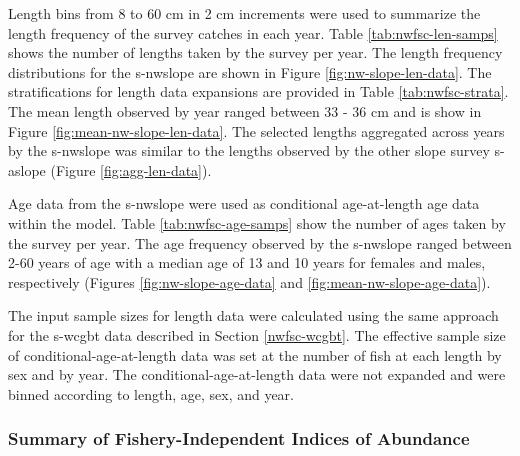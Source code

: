 \documentclass[11pt,
  english,
  a4paper,
]{article}
\begin{document}
Length bins from 8 to 60 cm in 2 cm increments were used to summarize the length frequency of the survey catches in each year. Table \ref{tab:nwfsc-len-samps} shows the number of lengths taken by the survey per year. The length frequency distributions for the \gls{s-nwslope} are shown in Figure \ref{fig:nw-slope-len-data}. The stratifications for length data expansions are provided in Table \ref{tab:nwfsc-strata}. The mean length observed by year ranged between 33 - 36 cm and is show in Figure \ref{fig:mean-nw-slope-len-data}. The selected lengths aggregated across years by the \gls{s-nwslope} was similar to the lengths observed by the other slope survey \gls{s-aslope} (Figure \ref{fig:agg-len-data}).

\leavevmode\tagmcend\tagstructend\par


Age data from the \gls{s-nwslope} were used as conditional age-at-length age data within the model. Table \ref{tab:nwfsc-age-samps} show the number of ages taken by the survey per year. The age frequency observed by the \gls{s-nwslope} ranged between 2-60 years of age with a median age of 13 and 10 years for females and males, respectively (Figures \ref{fig:nw-slope-age-data} and \ref{fig:mean-nw-slope-age-data}).

\leavevmode\tagmcend\tagstructend\par


The input sample sizes for length data were calculated using the same approach for the \gls{s-wcgbt} data described in Section \ref{nwfsc-wcgbt}. The effective sample size of conditional-age-at-length data was set at the number of fish at each length by sex and by year. The conditional-age-at-length data were not expanded and were binned according to length, age, sex, and year.

\leavevmode\tagmcend\tagstructend\par


\hypertarget{summary-of-fishery-independent-indices-of-abundance}{%
\subsubsection{Summary of Fishery-Independent Indices of Abundance}\label{summary-of-fishery-independent-indices-of-abundance}}
\end{document}
